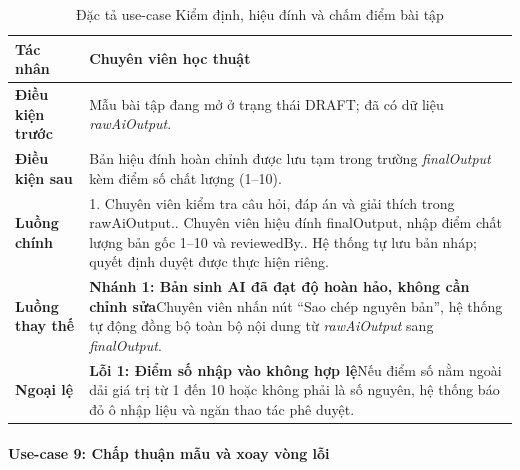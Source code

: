 \begingroup
\small
\begin{longtable}{|p{3.2cm}|p{\dimexpr\linewidth-3.2cm-4\tabcolsep-3\arrayrulewidth\relax}|}
\caption{Đặc tả use-case Kiểm định, hiệu đính và chấm điểm bài tập}
\label{aihub:tab:uc_academic_review_score}\\
\hline
\textbf{Tác nhân} & Chuyên viên học thuật \\ \hline
\textbf{Điều kiện trước} & Mẫu bài tập đang mở ở trạng thái DRAFT; đã có dữ liệu \textit{rawAiOutput}. \\ \hline
\textbf{Điều kiện sau} & Bản hiệu đính hoàn chỉnh được lưu tạm trong trường \textit{finalOutput} kèm điểm số chất lượng (1--10). \\ \hline
\textbf{Luồng chính} & 1. Chuyên viên kiểm tra câu hỏi, đáp án và giải thích trong rawAiOutput.\newline 2. Chuyên viên hiệu đính finalOutput, nhập điểm chất lượng bản gốc 1--10 và reviewedBy.\newline 3. Hệ thống tự lưu bản nháp; quyết định duyệt được thực hiện riêng. \\ \hline
\textbf{Luồng thay thế} &
\textbf{Nhánh 1: Bản sinh AI đã đạt độ hoàn hảo, không cần chỉnh sửa}\newline Chuyên viên nhấn nút ``Sao chép nguyên bản'', hệ thống tự động đồng bộ toàn bộ nội dung từ \textit{rawAiOutput} sang \textit{finalOutput}. \\ \hline
\textbf{Ngoại lệ} &
\textbf{Lỗi 1: Điểm số nhập vào không hợp lệ}\newline Nếu điểm số nằm ngoài dải giá trị từ 1 đến 10 hoặc không phải là số nguyên, hệ thống báo đỏ ô nhập liệu và ngăn thao tác phê duyệt. \\ \hline
\end{longtable}
\endgroup

\paragraph{Use-case 9: Chấp thuận mẫu và xoay vòng lỗi}

